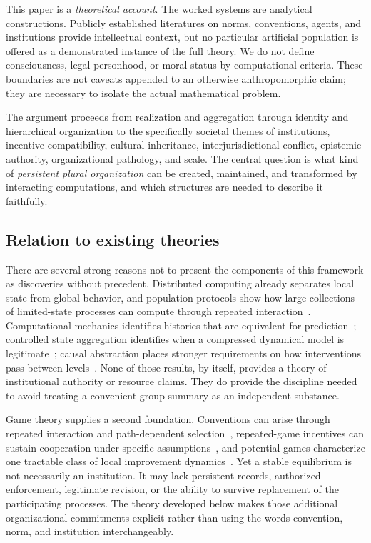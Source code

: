 This paper is a \emph{theoretical account}. The worked systems are analytical constructions. Publicly established literatures on norms, conventions, agents, and institutions provide intellectual context, but no particular artificial population is offered as a demonstrated instance of the full theory. We do not define consciousness, legal personhood, or moral status by computational criteria. These boundaries are not caveats appended to an otherwise anthropomorphic claim; they are necessary to isolate the actual mathematical problem.

The argument proceeds from realization and aggregation through identity and hierarchical organization to the specifically societal themes of institutions, incentive compatibility, cultural inheritance, interjurisdictional conflict, epistemic authority, organizational pathology, and scale. The central question is what kind of \emph{persistent plural organization} can be created, maintained, and transformed by interacting computations, and which structures are needed to describe it faithfully.

\subsection{Relation to existing theories}

There are several strong reasons not to present the components of this framework as discoveries without precedent. Distributed computing already separates local state from global behavior, and population protocols show how large collections of limited-state processes can compute through repeated interaction~\cite{MS:angluin}. Computational mechanics identifies histories that are equivalent for prediction~\cite{MS:shalizi}; controlled state aggregation identifies when a compressed dynamical model is legitimate~\cite{MS:givan}; causal abstraction places stronger requirements on how interventions pass between levels~\cite{MS:rubenstein,MS:beckers,MS:rischel}. None of those results, by itself, provides a theory of institutional authority or resource claims. They do provide the discipline needed to avoid treating a convenient group summary as an independent substance.

Game theory supplies a second foundation. Conventions can arise through repeated interaction and path-dependent selection~\cite{MS:young,MS:shoham}, repeated-game incentives can sustain cooperation under specific assumptions~\cite{MS:fudenbergmaskin}, and potential games characterize one tractable class of local improvement dynamics~\cite{MS:monderer}. Yet a stable equilibrium is not necessarily an institution. It may lack persistent records, authorized enforcement, legitimate revision, or the ability to survive replacement of the participating processes. The theory developed below makes those additional organizational commitments explicit rather than using the words convention, norm, and institution interchangeably.

